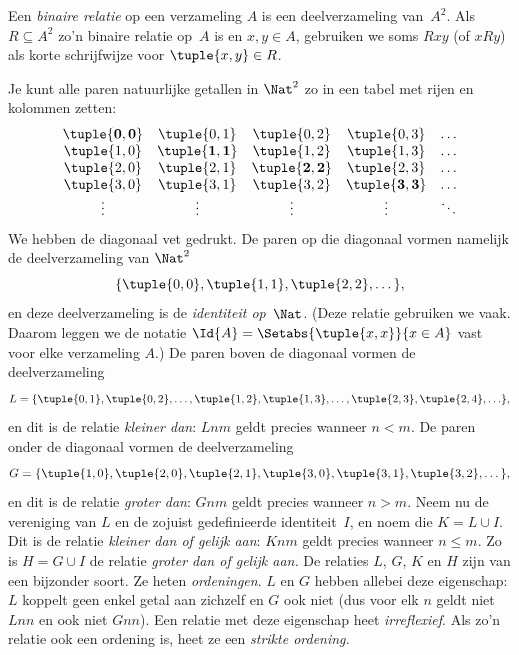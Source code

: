 \documentclass[../../../include/open-logic-section]{subfiles}
\begin{document}
\begin{defn}
Een \emph{binaire relatie} op een verzameling $A$ is een
deelverzameling van~$A^{2}$. Als $R \subseteq A^{2}$ zo'n binaire
relatie op~$A$ is en $x, y \in A$, gebruiken we soms $Rxy$ (of $xRy$)
als korte schrijfwijze voor $\tuple{x, y} \in R$.
\end{defn}
  
\begin{ex}
Je kunt alle paren natuurlijke getallen in $\Nat^{2}$ zo in een tabel
met rijen en kolommen zetten:
\[
  \begin{array}{ccccc}
  \mathbf{\tuple{ 0,0 }} & \tuple{ 0,1 } &
    \tuple{ 0,2 } & \tuple{ 0,3 } & \ldots\\
  \tuple{ 1,0 } & \mathbf{\tuple{ 1,1 }} &
    \tuple{ 1,2 } & \tuple{ 1,3 } & \ldots\\
  \tuple{ 2,0 } & \tuple{ 2,1 } &
    \mathbf{\tuple{ 2,2 }} & \tuple{ 2,3 } & \ldots\\
  \tuple{ 3,0 } & \tuple{ 3,1 } & \tuple{ 3,2 } &
    \mathbf{\tuple{ 3,3 }} & \ldots\\
  \vdots & \vdots & \vdots & \vdots & \mathbf{\ddots}
  \end{array}
\]
We hebben de diagonaal vet gedrukt. De paren op die diagonaal vormen
namelijk de deelverzameling van $\Nat^2$
\[
  \{\tuple{0,0 }, \tuple{ 1,1 }, \tuple{ 2,2 }, \dots\},
  \]
en deze deelverzameling is de \emph{identiteit op}~$\Nat$. (Deze relatie
gebruiken we vaak. Daarom leggen we de notatie
$\Id{A}=\Setabs{\tuple{ x,x }}{x \in A}$ vast voor elke verzameling
$A$.) De paren boven de
diagonaal vormen de deelverzameling
\[
  L = \{\tuple{ 0,1 },\tuple{ 0,2 },\ldots,\tuple{ 1,2 },
  \tuple{ 1,3 }, \dots, \tuple{ 2,3 }, \tuple{ 2,4 },\ldots\},
\]
en dit is de relatie \emph{kleiner dan}: $Lnm$ geldt precies wanneer
$n<m$. De paren onder de diagonaal vormen de deelverzameling
\[
  G=\{ \tuple{ 1,0 },\tuple{ 2,0 },\tuple{
    2,1 }, \tuple{ 3,0 },\tuple{ 3,1 },\tuple{ 3,2 }, \dots\},
\]
en dit is de relatie \emph{groter dan}: $Gnm$ geldt precies wanneer
$n>m$. Neem nu de vereniging van $L$ en de zojuist gedefinieerde
identiteit~$I$, en noem die $K=L\cup I$.
Dit is de relatie \emph{kleiner dan of gelijk aan}: $Knm$ geldt precies
wanneer $n \le m$. Zo is $H=G \cup I$ de relatie \emph{groter dan of
gelijk aan.} De relaties $L$, $G$, $K$ en $H$ zijn van een bijzonder
soort. Ze heten \emph{ordeningen}. $L$ en $G$ hebben allebei deze
eigenschap: $L$ koppelt geen enkel getal aan zichzelf en $G$ ook niet
(dus voor elk $n$ geldt niet $Lnn$ en
ook niet $Gnn$). Een relatie met deze eigenschap heet
\emph{irreflexief}. Als zo'n relatie ook een ordening is, heet ze een
\emph{strikte ordening.}
\end{ex}
\end{document}
